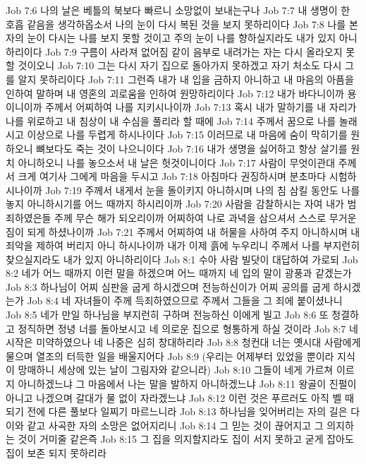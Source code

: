 Job 7:6  나의 날은 베틀의 북보다 빠르니 소망없이 보내는구나
Job 7:7  내 생명이 한 호흡 같음을 생각하옵소서 나의 눈이 다시 복된 것을 보지 못하리이다
Job 7:8  나를 본 자의 눈이 다시는 나를 보지 못할 것이고 주의 눈이 나를 향하실지라도 내가 있지 아니하리이다
Job 7:9  구름이 사라져 없어짐 같이 음부로 내려가는 자는 다시 올라오지 못할 것이오니
Job 7:10  그는 다시 자기 집으로 돌아가지 못하겠고 자기 처소도 다시 그를 알지 못하리이다
Job 7:11  그런즉 내가 내 입을 금하지 아니하고 내 마음의 아픔을 인하여 말하며 내 영혼의 괴로움을 인하여 원망하리이다
Job 7:12  내가 바다니이까 용이니이까 주께서 어찌하여 나를 지키시나이까
Job 7:13  혹시 내가 말하기를 내 자리가 나를 위로하고 내 침상이 내 수심을 풀리라 할 때에
Job 7:14  주께서 꿈으로 나를 놀래시고 이상으로 나를 두렵게 하시나이다
Job 7:15  이러므로 내 마음에 숨이 막히기를 원하오니 뼈보다도 죽는 것이 나으니이다
Job 7:16  내가 생명을 싫어하고 항상 살기를 원치 아니하오니 나를 놓으소서 내 날은 헛것이니이다
Job 7:17  사람이 무엇이관대 주께서 크게 여기사 그에게 마음을 두시고
Job 7:18  아침마다 권징하시며 분초마다 시험하시나이까
Job 7:19  주께서 내게서 눈을 돌이키지 아니하시며 나의 침 삼킬 동안도 나를 놓지 아니하시기를 어느 때까지 하시리이까
Job 7:20  사람을 감찰하시는 자여 내가 범죄하였은들 주께 무슨 해가 되오리이까 어찌하여 나로 과녁을 삼으셔서 스스로 무거운 짐이 되게 하셨나이까
Job 7:21  주께서 어찌하여 내 허물을 사하여 주지 아니하시며 내 죄악을 제하여 버리지 아니 하시나이까 내가 이제 흙에 누우리니 주께서 나를 부지런히 찾으실지라도 내가 있지 아니하리이다
Job 8:1  수아 사람 빌닷이 대답하여 가로되
Job 8:2  네가 어느 때까지 이런 말을 하겠으며 어느 때까지 네 입의 말이 광풍과 같겠는가
Job 8:3  하나님이 어찌 심판을 굽게 하시겠으며 전능하신이가 어찌 공의를 굽게 하시겠는가
Job 8:4  네 자녀들이 주께 득죄하였으므로 주께서 그들을 그 죄에 붙이셨나니
Job 8:5  네가 만일 하나님을 부지런히 구하며 전능하신 이에게 빌고
Job 8:6  또 청결하고 정직하면 정녕 너를 돌아보시고 네 의로운 집으로 형통하게 하실 것이라
Job 8:7  네 시작은 미약하였으나 네 나중은 심히 창대하리라
Job 8:8  청컨대 너는 옛시대 사람에게 물으며 열조의 터득한 일을 배울지어다
Job 8:9  (우리는 어제부터 있었을 뿐이라 지식이 망매하니 세상에 있는 날이 그림자와 같으니라)
Job 8:10  그들이 네게 가르쳐 이르지 아니하겠느냐 그 마음에서 나는 말을 발하지 아니하겠느냐
Job 8:11  왕골이 진펄이 아니고 나겠으며 갈대가 물 없이 자라겠느냐
Job 8:12  이런 것은 푸르러도 아직 벨 때 되기 전에 다른 풀보다 일찌기 마르느니라
Job 8:13  하나님을 잊어버리는 자의 길은 다 이와 같고 사곡한 자의 소망은 없어지리니
Job 8:14  그 믿는 것이 끊어지고 그 의지하는 것이 거미줄 같은즉
Job 8:15  그 집을 의지할지라도 집이 서지 못하고 굳게 잡아도 집이 보존 되지 못하리라
